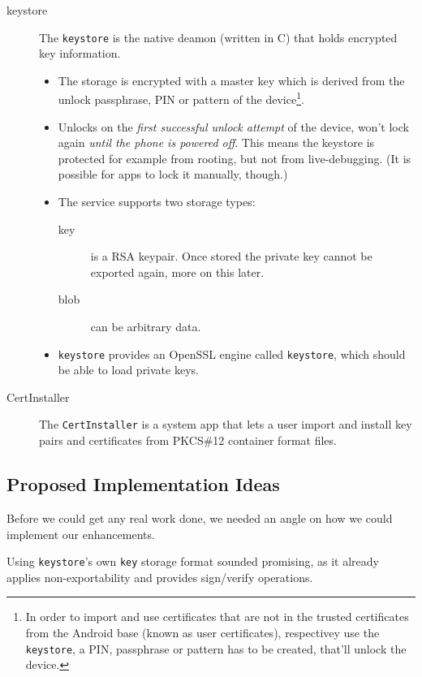 \documentclass[a4paper,draft]{scrartcl}
\begin{document}
\begin{description}
			\pagebreak[3]
			\item[keystore] The \texttt{keystore} is the native deamon (written in C) that holds encrypted key information.
				\begin{itemize}
					\item The storage is encrypted with a master key which is derived from the unlock passphrase, PIN or pattern of the device\footnote{In order to import and use certificates that are not in the trusted certificates from the Android base (known as user certificates), respectivey use the \texttt{keystore}, a PIN, passphrase or pattern has to be created, that'll unlock the device.}.
					\item Unlocks on the \emph{first successful unlock attempt} of the device, won't lock again \emph{until the phone is powered off}. This means the keystore is protected for example from rooting, but not from live-debugging. (It is possible for apps to lock it manually, though.)
					\item The service supports two storage types:
					\begin{description}
						\item[key] is a RSA keypair. Once stored the private key cannot be exported again, more on this later.
						\item[blob] can be arbitrary data.
					\end{description}
					\item \texttt{keystore} provides an OpenSSL engine called \texttt{keystore}, which should be able to load private keys. %
				\end{itemize}
			\item [CertInstaller] The \texttt{CertInstaller} is a system app that lets a user import and install key pairs and certificates from PKCS\#12 container format files. %
		\end{description}



	\subsection{Proposed Implementation Ideas}
		Before we could get any real work done, we needed an angle on how we could implement our enhancements.

		Using \texttt{keystore}'s own \texttt{key} storage format sounded promising, as it already applies non-exportability and provides sign/verify operations.
\end{document}
